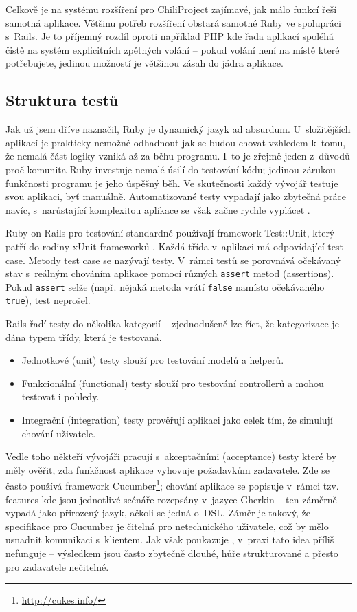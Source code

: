 \documentclass[thesis=B,czech]{FITthesis}[2012/05/02]
\begin{document}
Celkově je na systému rozšíření pro ChiliProject zajímavé, jak málo
funkcí řeší samotná aplikace. Většinu potřeb rozšíření obstará samotné
Ruby ve spolupráci s~Rails. Je to příjemný rozdíl oproti například PHP
kde řada aplikací spoléhá čistě na systém explicitních zpětných volání
-- pokud volání není na místě které potřebujete, jedinou možností je
většinou zásah do jádra aplikace.

\subsection{Struktura testů}

\label{sec:rails_tests}

Jak už jsem dříve naznačil, Ruby je dynamický jazyk ad absurdum.
U~složitějších aplikací je prakticky nemožné odhadnout jak se budou chovat
vzhledem k~tomu, že nemalá část logiky vzniká až za běhu programu. I~to
je zřejmě jeden z~důvodů proč komunita Ruby investuje nemalé úsilí do
testování kódu; jedinou zárukou funkčnosti programu je jeho úspěšný běh.
Ve skutečnosti každý vývojář testuje svou aplikaci, byť manuálně.
Automatizované testy vypadají jako zbytečná práce navíc, s~narůstající
komplexitou aplikace se však začne rychle vyplácet \citep{Rappin2011}.

Ruby on Rails pro testování standardně používají framework Test::Unit,
který patří do rodiny xUnit frameworků \citep{FowlerXunit}. Každá třída
v~aplikaci má odpovídající test case. Metody test case se nazývají
testy. V~rámci testů se porovnává očekávaný stav s~reálným chováním
aplikace pomocí různých \lstinline!assert! metod (assertions). Pokud
\lstinline!assert! selže (např. nějaká metoda vrátí \lstinline!false!
namísto očekávaného \lstinline!true!), test neprošel.

Rails řadí testy do několika kategorií -- zjednodušeně lze říct, že
kategorizace je dána typem třídy, která je testovaná.

\begin{itemize}
\item
  Jednotkové (unit) testy slouží pro testování modelů a helperů.
\item
  Funkcionální (functional) testy slouží pro testování controllerů a
  mohou testovat i pohledy.
\item
  Integrační (integration) testy prověřují aplikaci jako celek tím, že
  simulují chování uživatele.
\end{itemize}
Vedle toho někteří vývojáři pracují s~akceptačními (acceptance) testy
které by měly ověřit, zda funkčnost aplikace vyhovuje požadavkům
zadavatele. Zde se často používá framework Cucumber\footnote{\url{http://cukes.info/}};
chování aplikace se popisuje v~rámci tzv. features kde jsou jednotlivé
scénáře rozepsány v~jazyce Gherkin -- ten záměrně vypadá jako přirozený
jazyk, ačkoli se jedná o~\gls{DSL}. Záměr je takový, že specifikace pro
Cucumber je čitelná pro netechnického uživatele, což by mělo usnadnit
komunikaci s~klientem. Jak však poukazuje \citep{Kinsella2011}, v~praxi
tato idea příliš nefunguje -- výsledkem jsou často  zbytečně dlouhé, hůře strukturované a přesto pro
zadavatele nečitelné.
\end{document}
